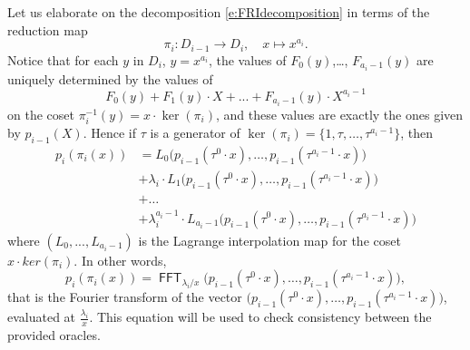 \documentclass[11pt,article,oneside]{memoir}
\theoremstyle{definition}
\theoremstyle{remark}
\DeclareMathOperator{\FFT}{\mathsf{FFT}}
\begin{document}
Let us elaborate on the decomposition \eqref{e:FRIdecomposition} in terms of the reduction map
\[
\pi_i: D_{i-1}\longrightarrow D_i, \quad x\mapsto x^{a_i}.
\] 
Notice that for each $y$ in $D_i$, $y= x^{a_i}$, the values of $F_0(y)$,\ldots, $F_{a_i-1}(y)$ are uniquely determined by the values of 
\[
F_0(y)+ F_1(y)\cdot X+...+F_{a_i-1}(y)\cdot X^{a_i-1} 
\] 
on the coset $\pi_i^{-1}(y)=x\cdot\ker(\pi_i)$, and these values are exactly the ones given by $p_{i-1}(X)$.
Hence if $\tau$ is a generator of $\ker(\pi_i)=\{1,\tau,\ldots, \tau^{a_i-1}\}$, then
\begin{equation*}
\begin{aligned}
p_i(\pi_i(x)) &= L_0\big(p_{i-1}\left(\tau^0\cdot x\right),\ldots, p_{i-1}\left(\tau^{a_i-1}\cdot x\right)\big) 
\\
&+ 
\lambda_i\cdot L_1\big(p_{i-1}\left(\tau^0\cdot x\right),\ldots, p_{i-1}\left(\tau^{a_i-1}\cdot x\right)\big) 
\\
&+ \ldots
\\
& + \lambda_i^{a_i-1}\cdot L_{a_i-1}\big(p_{i-1}\left(\tau^0\cdot x\right),\ldots, p_{i-1}\left(\tau^{a_i-1}\cdot x\right)\big) 
\end{aligned}
\end{equation*}
where $(L_0,...,L_{a_i-1})$ is the Lagrange interpolation map for the coset $x\cdot ker(\pi_i)$. 
In other words, 
\begin{equation}
\label{e:FRIconsistency}
p_i(\pi_i(x)) = \FFT_{\lambda_i / x}\big(p_{i-1}\left(\tau^0\cdot x\right),\ldots, p_{i-1}\left(\tau^{a_i-1}\cdot x\right)\big),
\end{equation}
that is the Fourier transform of the vector $\big(p_{i-1}\left(\tau^0\cdot x\right),\ldots, p_{i-1}\left(\tau^{a_i-1}\cdot x\right)\big)$, evaluated at $\frac{\lambda_i}{x}$.
This equation will be used to check consistency between the provided oracles. 
%
\end{document}
